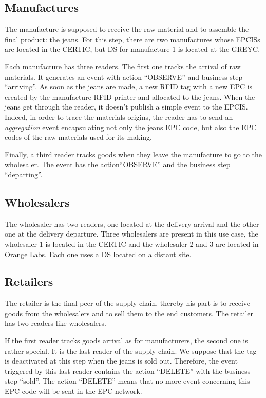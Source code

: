 \documentclass[a4paper]{llncs}
\begin{document}
\subsection{Manufactures}

The manufacture is supposed to receive the raw material and to assemble the final
product: the jeans. For this step, there are two manufactures whose EPCISs are
located in the CERTIC, but DS for manufacture 1 is located at the GREYC.
 
Each manufacture has three readers. The first one tracks the arrival of raw
materials. It generates an event with action ``OBSERVE'' and business step
``arriving''.  As soon as the jeans are made, a new RFID tag with a new EPC is
created by the manufacture RFID printer and allocated to the jeans. When the
jeans get through the reader, it doesn't publish a simple event to the
EPCIS. Indeed, in order to trace the materials origins, the reader has to send
an \emph{aggregation} event encapsulating not only the jeans EPC code, but also
the EPC codes of the raw materials used for its making.

Finally, a third reader tracks goods when they leave the manufacture to go to
the wholesaler. The event has the action``OBSERVE'' and the business step
``departing''.


\subsection{Wholesalers}

The wholesaler has two readers, one located at the delivery arrival and the
other one at the delivery departure. 
Three wholesalers are present in this use case, the wholesaler 1 is
located in the CERTIC and the wholesaler 2 and 3 are located in Orange
Labs. Each one uses a DS located on a distant site. 

\subsection{Retailers}

The retailer is the final peer of the supply chain, thereby his part is to
receive goods from the wholesalers and to sell them to the end
customers. The retailer has two readers like wholesalers. 

If the first reader tracks goods arrival as for manufacturers, the second one
is rather special.  It is the last reader of the supply chain.  We suppose that
the tag is deactivated at this step when the jeans is sold out.  Therefore, the
event triggered by this last reader contains the action ``DELETE'' with the
business step ``sold''.  The action ``DELETE'' means that no more event
concerning this EPC code will be sent in the EPC network.
\end{document}
